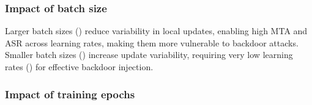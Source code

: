 \subsubsection{Impact of batch size}




Larger batch sizes () reduce variability in local updates, enabling high MTA and ASR across learning rates, making them more vulnerable to backdoor attacks. Smaller batch sizes () increase update variability, requiring very low learning rates () for effective backdoor injection.


\subsubsection{Impact of training epochs}



